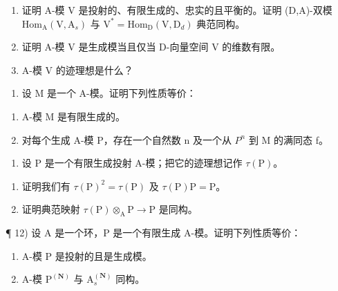 \begin{enumerate}
\def\labelenumi{\alph{enumi})}
\item
  证明 A-模 V 是投射的、有限生成的、忠实的且平衡的。证明 (D,A)-双模 \(\mathrm{Hom}_{\mathrm{A}}(\mathrm{V},\mathrm{A}_{s})\) 与 \(\mathrm{V}^{*}=\mathrm{Hom}_{\mathrm{D}}(\mathrm{V},\mathrm{D}_{d})\) 典范同构。
\item
  证明 A-模 V 是生成模当且仅当 D-向量空间 V 的维数有限。
\item
  A-模 V 的迹理想是什么？
\end{enumerate}

\begin{enumerate}
\def\labelenumi{\arabic{enumi})}
\setcounter{enumi}{9}
\tightlist
\item
  设 M 是一个 A-模。证明下列性质等价：
\end{enumerate}

\begin{enumerate}
\def\labelenumi{(\roman{enumi})}
\item
  A-模 M 是有限生成的。
\item
  对每个生成 A-模 P，存在一个自然数 n 及一个从 \(P^{n}\) 到 M 的满同态 f。
\end{enumerate}

\begin{enumerate}
\def\labelenumi{\arabic{enumi})}
\setcounter{enumi}{10}
\tightlist
\item
  设 \(\mathrm{P}\) 是一个有限生成投射 A-模；把它的迹理想记作 \(\tau(\mathrm{P})\)。\\
\end{enumerate}

\begin{enumerate}
\def\labelenumi{\alph{enumi})}
\item
  证明我们有 \(\tau(\mathrm{P})^2 = \tau(\mathrm{P})\) 及 \(\tau(\mathrm{P})\mathrm{P} = \mathrm{P}\)。
\item
  证明典范映射 \(\tau(\mathrm{P})\otimes_{\mathrm{A}}\mathrm{P}\to\mathrm{P}\) 是同构。
\end{enumerate}

¶ 12) 设 A 是一个环，P 是一个有限生成 A-模。证明下列性质等价：

\begin{enumerate}
\def\labelenumi{(\roman{enumi})}
\item
  A-模 P 是投射的且是生成模。
\item
  A-模 \(\mathrm{P}^{(\mathbf{N})}\) 与 \(\mathrm{A}_s^{(\mathbf{N})}\) 同构。
\end{enumerate}

